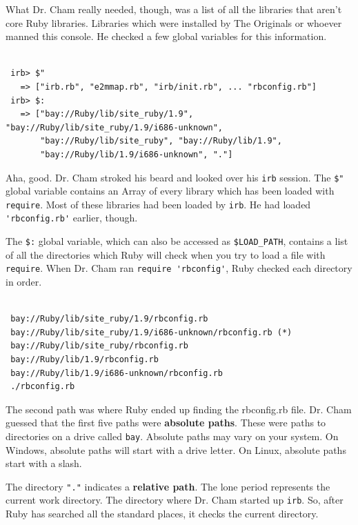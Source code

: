 \documentclass[10pt,twoside]{report}
\begin{document}
What Dr. Cham really needed, though, was a list of all the libraries
that aren't core Ruby libraries.  Libraries which were installed by
The Originals or whoever manned this console. He checked a few global
variables for this information.


\begin{lstlisting}

 irb> $"
   => ["irb.rb", "e2mmap.rb", "irb/init.rb", ... "rbconfig.rb"]
 irb> $:
   => ["bay://Ruby/lib/site_ruby/1.9", "bay://Ruby/lib/site_ruby/1.9/i686-unknown",
       "bay://Ruby/lib/site_ruby", "bay://Ruby/lib/1.9",
       "bay://Ruby/lib/1.9/i686-unknown", "."]

\end{lstlisting}


Aha, good.  Dr. Cham stroked his beard and looked over his
\lstinline[breaklines=true]|irb| session.  The
\lstinline[breaklines=true]|$"| global variable contains an Array of
every library which has been loaded with
\lstinline[breaklines=true]|require|.  Most of these libraries had
been loaded by \lstinline[breaklines=true]|irb|.  He had loaded
\lstinline[breaklines=true]|'rbconfig.rb'| earlier, though.

The \lstinline[breaklines=true]|$:| global variable, which can also be
accessed as \lstinline[breaklines=true]|$LOAD_PATH|, contains a list
of all the directories which Ruby will check when you try to load a
file with \lstinline[breaklines=true]|require|.  When Dr. Cham ran
\lstinline[breaklines=true]|require 'rbconfig'|, Ruby checked each
directory in order.


\begin{lstlisting}

 bay://Ruby/lib/site_ruby/1.9/rbconfig.rb
 bay://Ruby/lib/site_ruby/1.9/i686-unknown/rbconfig.rb (*)
 bay://Ruby/lib/site_ruby/rbconfig.rb
 bay://Ruby/lib/1.9/rbconfig.rb
 bay://Ruby/lib/1.9/i686-unknown/rbconfig.rb
 ./rbconfig.rb

\end{lstlisting}


The second path was where Ruby ended up finding the rbconfig.rb file.
Dr. Cham guessed that the first five paths were {\bf absolute paths}.
These were paths to directories on a drive called
\lstinline[breaklines=true]|bay|.  Absolute paths may vary on your
system.  On Windows, absolute paths will start with a drive letter.
On Linux, absolute paths start with a slash.

The directory \lstinline[breaklines=true]|"."| indicates a {\bf
  relative path}.  The lone period represents the current work
directory.  The directory where Dr. Cham started up
\lstinline[breaklines=true]|irb|.  So, after Ruby has searched all the
standard places, it checks the current directory.
\end{document}
